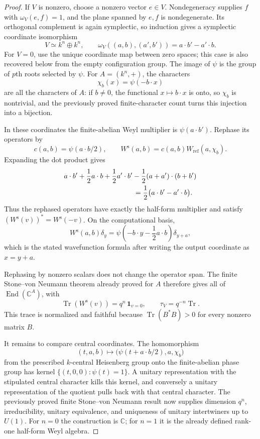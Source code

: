 \begin{proof}
If $V$ is nonzero, choose a nonzero vector $e\in V$.  Nondegeneracy
supplies $f$ with $\omega_V(e,f)=1$, and the plane spanned by $e,f$ is
nondegenerate.  Its orthogonal complement is again symplectic, so induction
gives a symplectic coordinate isomorphism
\[
 V\simeq k^n\oplus k^n,
 \qquad
 \omega_V((a,b),(a',b'))=a\mathbin{\cdot}b'-a'\mathbin{\cdot}b.
\]
For $V=0$, use the unique coordinate map between zero spaces; this case is
also recovered below from the empty configuration group.
The image of $\psi$ is the group of $p$th roots selected by $\psi$.  For
$A=(k^n,+)$, the characters
\[
 \chi_b(x)=\psi(-b\mathbin{\cdot}x)
\]
are all the characters of $A$: if $b\ne0$, the functional
$x\mapsto b\mathbin{\cdot}x$ is onto, so $\chi_b$ is nontrivial, and the
previously proved finite-character count turns this injection into a
bijection.

In these coordinates the finite-abelian Weyl multiplier is
$\psi(a\mathbin{\cdot}b')$.  Rephase its operators by
\[
 c(a,b)=\psi(a\mathbin{\cdot}b/2),
 \qquad
 W^{\mathrm s}(a,b)=c(a,b)W_{\mathrm{ref}}(a,\chi_b).
\]
Expanding the dot product gives
\begin{align*}
 &a\mathbin{\cdot}b'
 +\frac12a\mathbin{\cdot}b
 +\frac12a'\mathbin{\cdot}b'
 -\frac12(a+a')\mathbin{\cdot}(b+b') \\
 &\hspace{35mm}
 =\frac12\bigl(a\mathbin{\cdot}b'-a'\mathbin{\cdot}b\bigr).
\end{align*}
Thus the rephased operators have exactly the half-form multiplier and satisfy
$(W^{\mathrm s}(v))^*=W^{\mathrm s}(-v)$.  On the computational basis,
\[
 W^{\mathrm s}(a,b)\delta_y
 =\psi\!\left(-b\mathbin{\cdot}y-\frac12a\mathbin{\cdot}b\right)
   \delta_{y+a},
\]
which is the stated wavefunction formula after writing the output coordinate
as $x=y+a$.

Rephasing by nonzero scalars does not change the operator span.  The finite
Stone--von Neumann theorem already proved for $A$ therefore gives all of
$\operatorname{End}(\mathbb C^A)$, with
\[
 \operatorname{Tr}(W^{\mathrm s}(v))=q^n\,\mathbf 1_{v=0},
 \qquad
 \tau_V=q^{-n}\operatorname{Tr}.
\]
This trace is normalized and faithful because
$\operatorname{Tr}(B^*B)>0$ for every nonzero matrix $B$.

It remains to compare central coordinates.  The homomorphism
\[
 (t,a,b)\longmapsto
 \bigl(\psi(t+a\mathbin{\cdot}b/2),a,\chi_b\bigr)
\]
from the prescribed $k$-central Heisenberg group onto the finite-abelian
phase group has kernel
$\{(t,0,0):\psi(t)=1\}$.  A unitary representation with the stipulated
central character kills this kernel, and conversely a unitary representation
of the quotient pulls back with that central character.  The previously
proved finite Stone--von Neumann result now supplies dimension $q^n$,
irreducibility, unitary equivalence, and uniqueness of unitary intertwiners
up to $U(1)$.  For $n=0$ the construction is $\mathbb C$; for $n=1$ it is
the already defined rank-one half-form Weyl algebra.
\end{proof}


